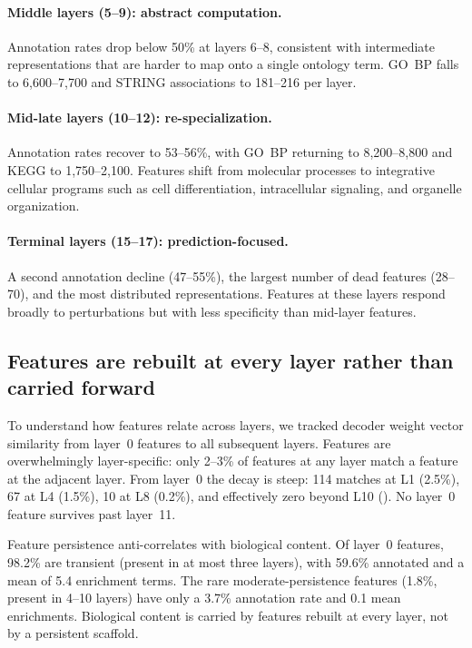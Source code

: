 \documentclass[onecolumn,11pt]{article}
\begin{document}
\paragraph{Middle layers (5--9): abstract computation.} Annotation rates drop below 50\% at layers
6--8, consistent with intermediate representations that are harder to map onto a single ontology
term. GO~BP falls to 6,600--7,700 and STRING associations to 181--216 per layer.

\paragraph{Mid-late layers (10--12): re-specialization.} Annotation rates recover to 53--56\%, with
GO~BP returning to 8,200--8,800 and KEGG to 1,750--2,100. Features shift from molecular processes
to integrative cellular programs such as cell differentiation, intracellular signaling, and
organelle organization.

\paragraph{Terminal layers (15--17): prediction-focused.} A second annotation decline (47--55\%),
the largest number of dead features (28--70), and the most distributed representations. Features at
these layers respond broadly to perturbations but with less specificity than mid-layer features.

\subsection*{Features are rebuilt at every layer rather than carried forward}
\label{sec:crosslayer}

To understand how features relate across layers, we tracked decoder weight vector similarity from
layer~0 features to all subsequent layers. Features are overwhelmingly layer-specific: only 2--3\%
of features at any layer match a feature at the adjacent layer. From layer~0 the decay is steep:
114 matches at L1 (2.5\%), 67 at L4 (1.5\%), 10 at L8 (0.2\%), and effectively zero beyond L10
(). No
layer~0 feature survives past layer~11.

Feature persistence anti-correlates with biological content. Of layer~0 features, 98.2\% are
transient (present in at most three layers), with 59.6\% annotated and a mean of 5.4 enrichment
terms. The rare moderate-persistence features (1.8\%, present in 4--10 layers) have only a 3.7\%
annotation rate and 0.1 mean enrichments. Biological content is carried by features rebuilt at
every layer, not by a persistent scaffold.
\end{document}
